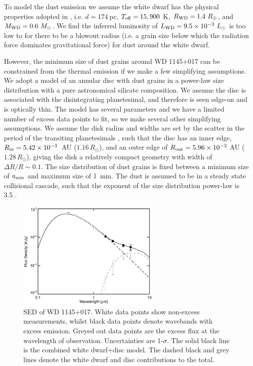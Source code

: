 \documentclass[useAMS,usenatbib]{mn2e}
\begin{document}
To model the dust emission we assume the white dwarf has the physical properties adopted in \cite{2015Natur.526..546V}, i.e. $d = 174~$pc, $T_{\rm eff} = 15,900~$K, $R_{\rm WD} = 1.4~R_{\oplus}$, and $M_{\rm WD} = 0.6~M_{\odot}$. We find the inferred luminosity of $L_{\rm WD} = 9.5\times10^{-3}~L_{\odot}$ is too low to for there to be a blowout radius (i.e. a grain size below which the radiation force dominates gravitational force) for dust around the white dwarf. 

However, the minimum size of dust grains around WD 1145+017 can be constrained from the thermal emission if we make a few simplifying assumptions. We adopt a model of an annular disc with dust grains in a power-law size distribution with a pure astronomical silicate composition. We assume the disc is associated with the disintegrating planetesimal, and therefore is seen edge-on and is optically thin. The model has several parameters and we have a limited number of excess data points to fit, so we make several other simplifying assumptions. We assume the disk radius and widths are set by the scatter in the period of the transiting planetesimals \citep[4.5--4.9 hrs,][]{2015Natur.526..546V}, such that the disc has an inner edge, $R_{\rm in}=5.42\times10^{-3}$~AU ($1.16\,R_\odot$), and an outer edge of $R_{\rm out} = 5.96\times10^{-3}~$AU ($1.28\,R_\odot$), giving the disk a relatively compact geometry with width of $\Delta R/R \sim 0.1$. The size distribution of dust grains is fixed between a minimum size of $a_{\rm min}$ and maximum size of 1~mm. The dust is assumed to be in a steady state collisional cascade, such that the exponent of the size distribution power-law is 3.5 \citep{1969JGR....74.2531D}. 

\begin{figure}
    \centering
    \includegraphics[width=7cm]{plots/wd1145p017_sed_astrosil.eps}
    \caption{SED of WD 1145+017. White data points show non-excess measurements, whilst black data points denote wavebands with excess emission. Greyed out data points are the excess flux at the wavelength of observation. Uncertainties are 1-$\sigma$. The solid black line is the combined white dwarf+disc model. The dashed black and grey lines denote the white dwarf and disc contributions to the total. \label{fig:wd1145p017_sed}}
\end{figure}
\end{document}
